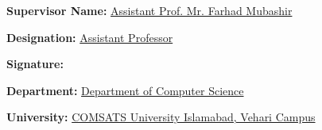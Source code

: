 \noindent
\textbf{Supervisor Name:} \underline{Assistant Prof. Mr. Farhad Mubashir}  

\vspace{0.5cm}

\noindent
\textbf{Designation:} \underline{Assistant Professor}  

\vspace{0.5cm}

\noindent
\textbf{Signature:} \underline{\hspace{6cm}}  

\vspace{0.5cm}

\noindent
\textbf{Department:} \underline{Department of Computer Science}  

\vspace{0.5cm}

\noindent
\textbf{University:} \underline{COMSATS University Islamabad, Vehari Campus}

\newpage
